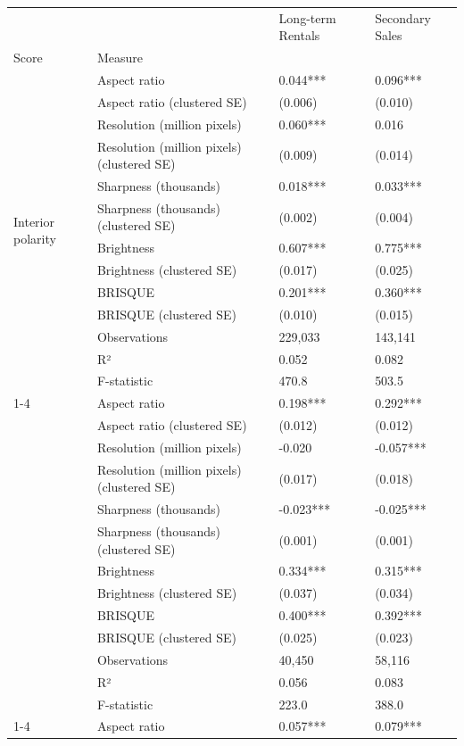 \begin{tabular}{llll}
\toprule
 &  & Long-term Rentals & Secondary Sales \\
Score & Measure &  &  \\
\midrule
\multirow[t]{13}{*}{Interior polarity} & Aspect ratio & 0.044*** & 0.096*** \\
 & Aspect ratio (clustered SE) & (0.006) & (0.010) \\
 & Resolution (million pixels) & 0.060*** & 0.016 \\
 & Resolution (million pixels) (clustered SE) & (0.009) & (0.014) \\
 & Sharpness (thousands) & 0.018*** & 0.033*** \\
 & Sharpness (thousands) (clustered SE) & (0.002) & (0.004) \\
 & Brightness & 0.607*** & 0.775*** \\
 & Brightness (clustered SE) & (0.017) & (0.025) \\
 & BRISQUE & 0.201*** & 0.360*** \\
 & BRISQUE (clustered SE) & (0.010) & (0.015) \\
 & Observations & 229,033 & 143,141 \\
 & R² & 0.052 & 0.082 \\
 & F-statistic & 470.8 & 503.5 \\
\cline{1-4}
\multirow[t]{13}{*}{Exterior polarity} & Aspect ratio & 0.198*** & 0.292*** \\
 & Aspect ratio (clustered SE) & (0.012) & (0.012) \\
 & Resolution (million pixels) & -0.020 & -0.057*** \\
 & Resolution (million pixels) (clustered SE) & (0.017) & (0.018) \\
 & Sharpness (thousands) & -0.023*** & -0.025*** \\
 & Sharpness (thousands) (clustered SE) & (0.001) & (0.001) \\
 & Brightness & 0.334*** & 0.315*** \\
 & Brightness (clustered SE) & (0.037) & (0.034) \\
 & BRISQUE & 0.400*** & 0.392*** \\
 & BRISQUE (clustered SE) & (0.025) & (0.023) \\
 & Observations & 40,450 & 58,116 \\
 & R² & 0.056 & 0.083 \\
 & F-statistic & 223.0 & 388.0 \\
\cline{1-4}
\multirow[t]{13}{*}{Floor-plan polarity} & Aspect ratio & 0.057*** & 0.079*** \\

\end{tabular}
